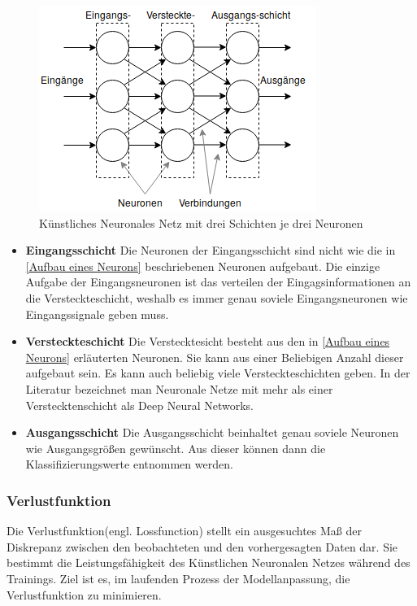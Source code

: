 \begin{figure}[htb]
  \centering  
  \includegraphics[scale=0.9]{img/mlp.png}
  \caption{Künstliches Neuronales Netz mit drei Schichten je drei Neuronen}
  \label{fig:neural_network}
\end{figure}


\begin{itemize}
\item \textbf{Eingangsschicht} Die Neuronen der Eingangsschicht sind nicht wie die in \ref{Aufbau eines Neurons} beschriebenen Neuronen aufgebaut. Die einzige Aufgabe der Eingangsneuronen ist das verteilen der Eingagsinformationen an die Versteckteschicht, weshalb es immer genau soviele Eingangsneuronen wie Eingangssignale geben muss.

\item \textbf{Versteckteschicht}
Die Verstecktesicht besteht aus den in \ref{Aufbau eines Neurons} erläuterten Neuronen. Sie kann aus einer Beliebigen Anzahl dieser aufgebaut sein. Es kann auch beliebig viele Versteckteschichten geben. In der Literatur bezeichnet man Neuronale Netze mit mehr als einer Verstecktenschicht als Deep Neural Networks.

\item \textbf{Ausgangsschicht}
Die Ausgangsschicht beinhaltet genau soviele Neuronen wie Ausgangsgrößen gewünscht.
Aus dieser können dann die Klassifizierungswerte entnommen werden.
\end{itemize}


\subsubsection{Verlustfunktion}
Die Verlustfunktion(engl. Lossfunction) stellt ein ausgesuchtes Maß der Diskrepanz zwischen den beobachteten und den vorhergesagten Daten dar. Sie bestimmt die Leistungsfähigkeit des Künstlichen Neuronalen Netzes während des Trainings. Ziel ist es, im laufenden Prozess der Modellanpassung, die Verlustfunktion zu minimieren.

